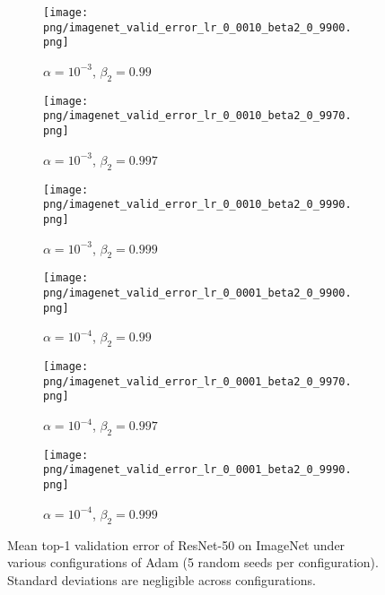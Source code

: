 {\begin{figure}[!th]
\begin{subfigure}[b]{0.33\linewidth}
\captionsetup{
  justification=centering,
  margin=0.1in,
  size=normalsize
}
\texttt{[image: png/imagenet\_valid\_error\_lr\_0\_0010\_beta2\_0\_9900.png]}
\caption{$\alpha = {10}^{-3}$, $\beta_2 = 0.99$}
\end{subfigure}
\begin{subfigure}[b]{0.33\linewidth}
\captionsetup{
  justification=centering,
  margin=0.1in,
  size=normalsize
}
\texttt{[image: png/imagenet\_valid\_error\_lr\_0\_0010\_beta2\_0\_9970.png]}
\caption{$\alpha = {10}^{-3}$, $\beta_2 = 0.997$}
\end{subfigure}
\begin{subfigure}[b]{0.33\linewidth}
\captionsetup{
  justification=centering,
  margin=0.1in,
  size=normalsize
}
\texttt{[image: png/imagenet\_valid\_error\_lr\_0\_0010\_beta2\_0\_9990.png]}
\caption{$\alpha = {10}^{-3}$, $\beta_2 = 0.999$}
\end{subfigure}

\begin{subfigure}[b]{0.33\linewidth}
\captionsetup{
  justification=centering,
  margin=0.1in,
  size=normalsize
}
\texttt{[image: png/imagenet\_valid\_error\_lr\_0\_0001\_beta2\_0\_9900.png]}
\caption{$\alpha = {10}^{-4}$, $\beta_2 = 0.99$}
\end{subfigure}
\begin{subfigure}[b]{0.33\linewidth}
\captionsetup{
  justification=centering,
  margin=0.1in,
  size=normalsize
}
\texttt{[image: png/imagenet\_valid\_error\_lr\_0\_0001\_beta2\_0\_9970.png]}
\caption{$\alpha = {10}^{-4}$, $\beta_2 = 0.997$}
\end{subfigure}
\begin{subfigure}[b]{0.33\linewidth}
\captionsetup{
  justification=centering,
  margin=0.1in,
  size=normalsize
}
\texttt{[image: png/imagenet\_valid\_error\_lr\_0\_0001\_beta2\_0\_9990.png]}
\caption{$\alpha = {10}^{-4}$, $\beta_2 = 0.999$}
\end{subfigure}

\caption{Mean top-1 validation error of ResNet-50 on ImageNet under various configurations of Adam (5 random seeds per configuration). Standard deviations are negligible across configurations.}
  
\label{fig:imagenet-valid-error-full}\end{figure}}

